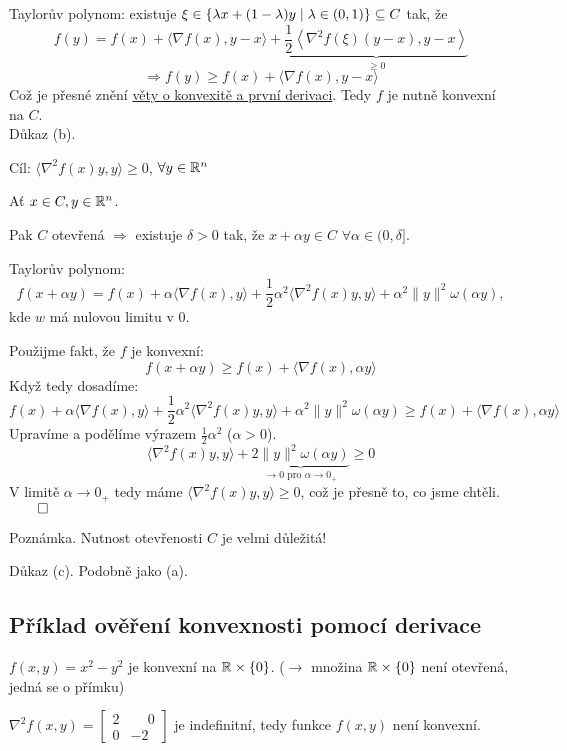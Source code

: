 Taylorův polynom: existuje $\xi \in \left\lbrace \lambda x + (1-\lambda)y \mid \lambda \in (0,1) \right\rbrace \subseteq C$ tak, že
\[
    f(y) = f(x) + \langle \nabla f(x), y-x\rangle + \underbrace{\frac{1}{2} \left\langle \nabla^2 f(\xi) (y-x),
    y-x\right\rangle}_{\geq 0}
\]
\[
    \Rightarrow f(y) \geq f(x) + \langle \nabla f(x), y-x\rangle
\]
Což je přesné znění \hyperref[konvDeriv]{věty o konvexitě a první derivaci}. Tedy $f$ je nutně konvexní na $C$.
\\
Důkaz (b).

Cíl: $\langle \nabla^2 f(x)y, y\rangle \geq 0$, $\forall y \in \mathbb{R}^n$

Ať $x \in C, y \in \mathbb{R}^n$.

Pak
$C$ otevřená $\Rightarrow$ existuje $\delta > 0$ tak, že $x + \alpha y \in C$ $\forall \alpha \in (0, \delta]$.

Taylorův polynom:
\[
    f(x+ \alpha y) = f(x) + \alpha \langle \nabla f(x), y\rangle + \frac{1}{2}\alpha^2 \langle \nabla^2 f(x)y, y\rangle
    + \alpha^2 \| y\|^2 \omega(\alpha y),
\]
kde $w$ má nulovou limitu v $0$.

Použijme fakt, že $f$ je konvexní:
\[
    f(x+\alpha y) \geq f(x) + \langle \nabla f(x), \alpha y\rangle
\]
Když tedy dosadíme:
\[
    f(x) + \alpha \langle \nabla f(x), y\rangle + \frac{1}{2}\alpha^2 \langle \nabla^2 f(x)y, y\rangle
    + \alpha^2 \| y\|^2 \omega(\alpha y) \geq f(x) + \langle \nabla f(x), \alpha y\rangle
\]
Upravíme a podělíme výrazem $\frac{1}{2}\alpha^2$ ($\alpha > 0$).
\[
   \langle \nabla^2 f(x)y, y\rangle + \underbrace{2 \| y\|^2 \omega(\alpha y)}_{\rightarrow 0 \text{ pro }
   \alpha \rightarrow 0_+} \geq 0
\]
V limitě $\alpha \rightarrow 0_+$ tedy máme $\langle \nabla^2 f(x)y, y\rangle \geq 0$, což je přesně to, co jsme chtěli.
$\qed$

Poznámka. Nutnost otevřenosti $C$ je velmi důležitá!

Důkaz (c). Podobně jako (a).

\subsection{Příklad ověření konvexnosti pomocí derivace}
$f(x, y) = x^2 - y^2$ je konvexní na $\mathbb{R} \times \left\lbrace 0 \right\rbrace$. ($\rightarrow$ množina $\mathbb{R} \times \left\lbrace 0 \right\rbrace$ není
otevřená, jedná se o přímku)

$\nabla^2 f(x, y) =
\begin{bmatrix}
    2 & \phantom{-}0 \\
    0 & -2
\end{bmatrix}$ je indefinitní, tedy funkce $f(x, y)$ není konvexní.

